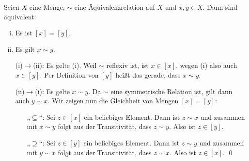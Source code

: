 \begin{satz} \label{aequiklassegleich}
    Seien $X$ eine Menge, $\sim$ eine Äquivalenzrelation auf $X$ und $x,y\in X$. Dann sind äquivalent:
    \begin{enumerate}[(i)]
        \item Es ist $[x]=[y]$.
        \item Es gilt $x\sim y$.
    \end{enumerate}
\end{satz}


\begin{bew} \quad
    \begin{itemize}
        \item[(i)$\to$(ii):] Es gelte (i). Weil $\sim$ reflexiv ist, ist $x\in [x]$, wegen (i) also auch $x\in [y]$. Per Definition von $[y]$ heißt das gerade, dass $x\sim y$.
        \item[(ii)$\to$(i):] Es gelte $x\sim y$. Da $\sim$ eine symmetrische Relation ist, gilt dann auch $y\sim x$. Wir zeigen nun die Gleichheit von Mengen $[x]=[y]$:
        \begin{itemize}
            \item[„$\subseteq$“:] Sei $z\in [x]$ ein beliebiges Element. Dann ist $z\sim x$ und zusammen mit $x\sim y$ folgt aus der Transitivität, dass $z\sim y$. Also ist $z\in [y]$.
            \item[„$\supseteq$“:] Sei $z\in [y]$ ein beliebiges Element. Dann ist $z\sim y$ und zusammen mit $y\sim x$ folgt aus der Transitivität, dass $z\sim x$. Also ist $z\in [x]$. \qed
        \end{itemize}
    \end{itemize}
\end{bew}


